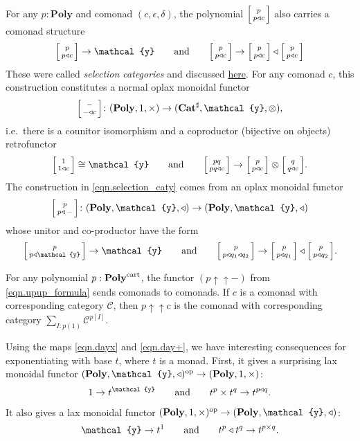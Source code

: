 \documentclass[11pt, one side, article]{memoir}
\makeatletter
\theoremstyle{definition}
\theoremstyle{plain}
\newcommand{\cat}[1]{\mathcal{#1}}%
\newcommand{\Cat}[1]{\mathbf{#1}}%
\newcommand{\To}[2][]{\xrightarrow[#1]{\tn{$#2$}}}
\newcommand{\op}{^\tn{op}}
\newcommand{\tn}[1]{\textnormal{#1}}
\newcommand{\catsharp}{\Cat{Cat}^{\sharp}}
\newcommand{\yon}{{\mathcal{y}}}
\newcommand{\poly}{\Cat{Poly}}
\newcommand{\cart}{\tn{cart}}
\newcommand{\polycart}{\poly^\cart}
\newcommand{\0}{\textsf{0}}
\newcommand{\1}{\tn{\textsf{1}}}
\newcommand{\tri}{\mathbin{\triangleleft}}
\newcommand{\biglens}[2]{
     \begin{bmatrix}{\vphantom{f_f^f}#2} \\ {\vphantom{f_f^f}#1} \end{bmatrix}
}
\newcommand{\littlelens}[2]{
     \begin{bsmallmatrix}{\vphantom{f}#2} \\ {\vphantom{f}#1} \end{bsmallmatrix}
}
\newcommand{\lens}[2]{
  \relax\if@display
     \biglens{#1}{#2}
  \else
     \littlelens{#1}{#2}
  \fi
}
\newcommand{\upup}{\uparrow\!\uparrow}
\newcommand{\hh}[2][]{#1 \tn{#2} #1}
\newcommand{\qqand}{\hh[\qquad]{and}}
\makeatother
\begin{document}
For any $p:\poly$ and comonad $(c,\epsilon,\delta)$, the polynomial $\lens{p\tri c}{p}$ also carries a comonad structure
\begin{equation}\label{eqn.selection_caty}
  \lens{p\tri c}{p}\to\yon
  \qqand
  \lens{p\tri c}{p}\to\lens{p\tri c}{p}\tri\lens{p\tri c}{p}
\end{equation}
These were called \emph{selection categories} and discussed \href{https://topos.site/blog/2021/12/creating-new-categories-from-old-selection-categories/}{here}. 
For any comonad $c$, this construction constitutes a normal oplax monoidal functor
\begin{equation}
\lens{-\tri c}{-}\colon(\poly,1,\times)\to(\catsharp,\yon,\otimes),
\end{equation}
i.e.\ there is a counitor isomorphism and a coproductor (bijective on objects) retrofunctor
\begin{equation}
 \lens{1\tri c}{1}\cong\yon
 \qqand
 \lens{pq\tri c}{pq}\to\lens{p\tri c}{p}\otimes\lens{q\tri c}{q}.
\end{equation}
The construction in \eqref{eqn.selection_caty} comes from an oplax monoidal functor
\begin{equation}
	\lens{p\tri\,-}{p}\colon(\poly,\yon,\tri)\to(\poly,\yon,\tri)
\end{equation}
whose unitor and co-productor have the form
\begin{equation}
  \lens{p\tri\yon}{p}\to\yon
  \qqand
  \lens{p\tri q_1\tri q_2}{p}\to\lens{p\tri q_1}{p}\tri\lens{p\tri q_2}{p}.
\end{equation}

For any polynomial $p:\polycart$, the functor $(p\upup -)$ from \eqref{eqn.upup_formula} sends comonads to comonads. If $c$ is a comonad with corresponding category $\cat{C}$, then $p\upup c$ is the comonad with corresponding category $\sum_{I:p(1)}\cat{C}^{p[I]}$.


Using the maps \eqref{eqn.dayx} and \eqref{eqn.day+}, we have interesting consequences for exponentiating with base $t$, where $t$ is a monad. First, it gives a surprising lax monoidal functor $(\poly,\yon,\tri)\op\to(\poly,1,\times)$:
\begin{equation}\label{eqn.monad_times}
	1\to t^\yon
	\qqand
	t^p\times t^q\to t^{p\tri q}.
\end{equation}
It also gives a lax monoidal functor $(\poly,1,\times)\op\to(\poly,\yon,\tri)$:
\begin{equation}\label{eqn.monad_tri}
	\yon\to t^1
	\qqand
	t^p\tri t^q\to t^{p\times q}.
\end{equation}
\end{document}
